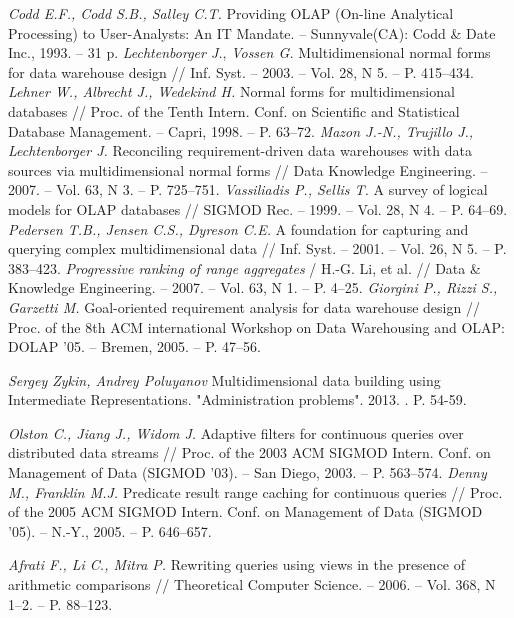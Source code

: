 \begin{thebibliography}{9}
  \textit{Codd E.F., Codd S.B., Salley C.T.}
  Providing OLAP (On-line Analytical Processing) to User-Analysts: An IT
  Mandate. – Sunnyvale(CA): Codd \& Date Inc.,
  1993.
  – 31 p.
  \textit{Lechtenborger J.}, \textit{Vossen G.}
  Multidimensional normal forms for data warehouse design
  // Inf. Syst.
  – 2003.
  – Vol. 28, N 5. – P. 415–434. 
  \textit{Lehner W., Albrecht J., Wedekind H.}
  Normal forms for multidimensional databases
  // Proc. of the Tenth Intern. Conf. on Scientific and Statistical Database
  Management.
  – Capri, 1998.
  – P. 63–72.
  \textit{Mazon J.-N., Trujillo J., Lechtenborger J.}
  Reconciling requirement-driven data warehouses with data sources via
  multidimensional normal forms
  // Data Knowledge Engineering.
  – 2007.
  – Vol. 63, N 3. – P. 725–751.
  \textit{Vassiliadis P., Sellis T.}
  A survey of logical models for OLAP databases
  // SIGMOD Rec.
  – 1999.
  – Vol. 28, N 4. – P. 64–69.
  \textit{Pedersen T.B., Jensen C.S., Dyreson C.E.}
  A foundation for capturing and querying complex multidimensional data
  // Inf. Syst.
  – 2001.
  – Vol. 26, N 5. – P. 383–423.
  \textit{Progressive ranking of range aggregates}
  / H.-G. Li, et al.
  // Data \& Knowledge Engineering.
  – 2007.
  – Vol. 63, N 1. – P. 4–25. 
  \textit{Giorgini P., Rizzi S., Garzetti M.}
  Goal-oriented requirement analysis for data warehouse design
  // Proc. of the 8th ACM international Workshop on Data Warehousing and OLAP: DOLAP '05.
  – Bremen, 2005.
  – P. 47–56.

  \textit{Sergey Zykin, Andrey Poluyanov}
  Multidimensional data building using Intermediate Representations.
  "Administration problems".
  2013.
  . P. 54-59.

  \textit{Olston C., Jiang J., Widom J.}
  Adaptive filters for continuous queries over distributed data streams
  // Proc. of the 2003 ACM SIGMOD Intern. Conf. on Management of Data (SIGMOD '03).
  – San Diego, 2003.
  – P. 563–574.
  \textit{Denny M., Franklin M.J.}
  Predicate result range caching for continuous queries
  // Proc. of the 2005 ACM SIGMOD Intern. Conf. on Management of Data (SIGMOD '05).
  – N.-Y., 2005.
  – P. 646–657.

  \textit{Afrati F., Li C., Mitra P.}
  Rewriting queries using views in the presence of arithmetic comparisons
  // Theoretical Computer Science.
  – 2006.
 – Vol. 368, N 1–2. – P. 88–123.


\end{thebibliography}
